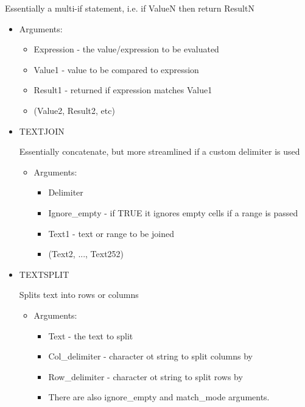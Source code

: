 \documentclass[8pt]{extarticle}
\begin{document}
\begin{multicols}{3}
\begin{itemize}
    Essentially a multi-if statement, i.e. if ValueN then return ResultN
    \begin{itemize}
        \item Arguments:
        \begin{itemize}
            \item Expression - the value/expression to be evaluated
            \item Value1 - value to be compared to expression
            \item Result1 - returned if expression matches Value1
            \item (Value2, Result2, etc)
        \end{itemize}
    \end{itemize}
\end{itemize}

\begin{itemize}
    \item TEXTJOIN
    
    Essentially concatenate, but more streamlined if a custom delimiter is used
    \begin{itemize}
        \item Arguments:
        \begin{itemize}
            \item Delimiter
            \item Ignore\_empty - if TRUE it ignores empty cells if a range is passed
            \item Text1 - text or range to be joined
            \item (Text2, ..., Text252)
        \end{itemize}
    \end{itemize}
\end{itemize}

\begin{itemize}
    \item TEXTSPLIT
    
    Splits text into rows or columns
    \begin{itemize}
        \item Arguments:
        \begin{itemize}
            \item Text - the text to split
            \item Col\_delimiter - character ot string to split columns by
            \item Row\_delimiter - character ot string to split rows by
            \item There are also ignore\_empty and match\_mode arguments.
        \end{itemize}
    \end{itemize}
\end{itemize}


\end{multicols}
\end{document}

